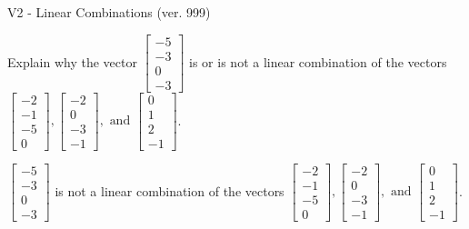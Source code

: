 \begin{exercise}
  \begin{exerciseTitle}V2 - Linear Combinations (ver. 999)\end{exerciseTitle}
  \begin{exerciseStatement}
    Explain why the vector \(\left[\begin{array}{c}
-5 \\
-3 \\
0 \\
-3
\end{array}\right]\)  is or is not a linear 
	combination of the vectors \(\left[\begin{array}{c}
-2 \\
-1 \\
-5 \\
0
\end{array}\right] , \left[\begin{array}{c}
-2 \\
0 \\
-3 \\
-1
\end{array}\right] , \text{ and } \left[\begin{array}{c}
0 \\
1 \\
2 \\
-1
\end{array}\right]\).
	


  \end{exerciseStatement}
  \begin{exerciseAnswer}
   \(\left[\begin{array}{c}
-5 \\
-3 \\
0 \\
-3
\end{array}\right]\) 
  	 is not  
	a linear combination of the vectors \(\left[\begin{array}{c}
-2 \\
-1 \\
-5 \\
0
\end{array}\right] , \left[\begin{array}{c}
-2 \\
0 \\
-3 \\
-1
\end{array}\right] , \text{ and } \left[\begin{array}{c}
0 \\
1 \\
2 \\
-1
\end{array}\right]\).

	
  


  \end{exerciseAnswer}
\end{exercise}